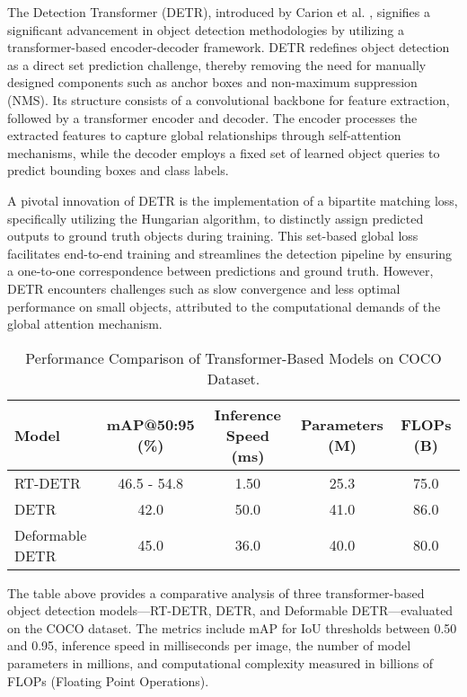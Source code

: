 \documentclass[3p,times]{elsarticle}
\begin{document}
The Detection Transformer (DETR), introduced by Carion et al. \cite{carion2020endtoendobjectdetectiontransformers}, signifies a significant advancement in object detection methodologies by utilizing a transformer-based encoder-decoder framework. DETR redefines object detection as a direct set prediction challenge, thereby removing the need for manually designed components such as anchor boxes and non-maximum suppression (NMS). Its structure consists of a convolutional backbone for feature extraction, followed by a transformer encoder and decoder. The encoder processes the extracted features to capture global relationships through self-attention mechanisms, while the decoder employs a fixed set of learned object queries to predict bounding boxes and class labels.

A pivotal innovation of DETR is the implementation of a bipartite matching loss, specifically utilizing the Hungarian algorithm, to distinctly assign predicted outputs to ground truth objects during training. This set-based global loss facilitates end-to-end training and streamlines the detection pipeline by ensuring a one-to-one correspondence between predictions and ground truth. However, DETR encounters challenges such as slow convergence and less optimal performance on small objects, attributed to the computational demands of the global attention mechanism.

\begin{table}[H]
\centering
\caption{Performance Comparison of Transformer-Based Models on COCO Dataset.}
\label{tab:transformer_performance_comparison}
\begin{tabular}{|l|c|c|c|c|}
\hline
\textbf{Model} & \textbf{mAP@50:95 (\%)} & \textbf{Inference Speed (ms)} & \textbf{Parameters (M)} & \textbf{FLOPs (B)} \\ \hline
RT-DETR        & 46.5 - 54.8             & 1.50                          & 25.3                    & 75.0               \\ \hline
DETR           & 42.0                    & 50.0                          & 41.0                    & 86.0               \\ \hline
Deformable DETR& 45.0                    & 36.0                          & 40.0                    & 80.0               \\ \hline
\end{tabular}
\end{table}

The table above provides a comparative analysis of three transformer-based object detection models—RT-DETR, DETR, and Deformable DETR—evaluated on the COCO dataset. The metrics include mAP for IoU thresholds between 0.50 and 0.95, inference speed in milliseconds per image, the number of model parameters in millions, and computational complexity measured in billions of FLOPs (Floating Point Operations).
\end{document}
